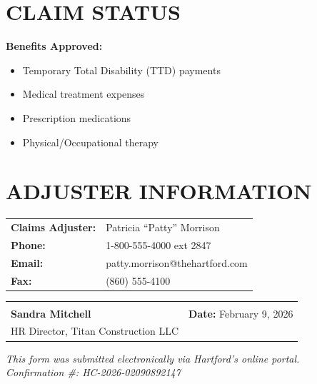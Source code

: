 \documentclass[11pt]{article}
\begin{document}
\section*{CLAIM STATUS}

\vspace{0.5em}
\begin{center}
\end{center}

\vspace{1em}

\textbf{Benefits Approved:}
\begin{itemize}[nosep]
\item Temporary Total Disability (TTD) payments
\item Medical treatment expenses
\item Prescription medications
\item Physical/Occupational therapy
\end{itemize}

\section*{ADJUSTER INFORMATION}

\begin{tabular}{@{}p{4cm}p{10cm}@{}}
\textbf{Claims Adjuster:} & Patricia ``Patty'' Morrison \\
\textbf{Phone:} & 1-800-555-4000 ext 2847 \\
\textbf{Email:} & patty.morrison@thehartford.com \\
\textbf{Fax:} & (860) 555-4100 \\
\end{tabular}

\vspace{2em}

\begin{tabular}{@{}p{7cm}p{7cm}@{}}
\hrulefill & \hrulefill \\
\textbf{Sandra Mitchell} & \textbf{Date:} February 9, 2026 \\
HR Director, Titan Construction LLC & \\
\end{tabular}

\vspace{2em}

\begin{center}
\small\textit{This form was submitted electronically via Hartford's online portal.\\
Confirmation \#: HC-2026-02090892147}
\end{center}
\end{document}
